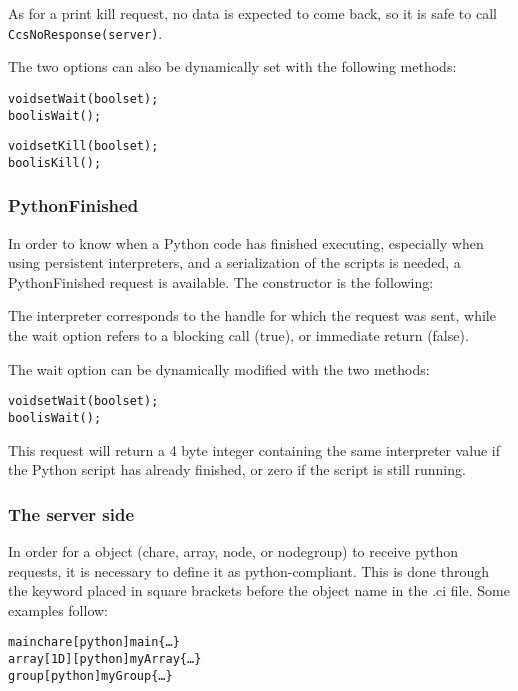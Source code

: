 As for a print kill request, no data is expected to come back, so it is safe to
call \texttt{CcsNoResponse(server)}.

The two options can also be dynamically set with the following methods:

\begin{alltt}
void setWait(bool set);
bool isWait();

void setKill(bool set);
bool isKill();
\end{alltt}

\subsubsection{PythonFinished}

\label{pythonFinished}

In order to know when a Python code has finished executing, especially when
using persistent interpreters, and a serialization of the scripts is needed, a
PythonFinished request is available. The constructor is the following:


The interpreter corresponds to the handle for which the request was sent, while
the wait option refers to a blocking call (true), or immediate return (false).

The wait option can be dynamically modified with the two methods:

\begin{alltt}
void setWait(bool set);
bool isWait();
\end{alltt}

This request will return a 4 byte integer containing the same interpreter value
if the Python script has already finished, or zero if the script is still
running.

\subsubsection{The server side}

\label{pythonServer}

In order for a \charmpp{} object (chare, array, node, or nodegroup) to receive
python requests, it is necessary to define it as python-compliant. This is done
through the keyword  placed in square brackets before the object name
in the .ci file. Some examples follow:

\begin{alltt}
mainchare [python] main \{\ldots\}
array [1D] [python] myArray \{\ldots\}
group [python] myGroup \{\ldots\}
\end{alltt}

